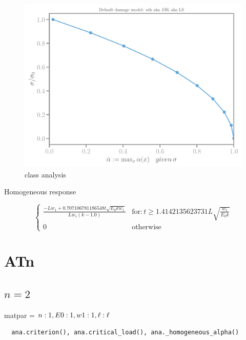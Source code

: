 \documentclass[]{article}
\begin{document}
\begin{figure}[htbp]
  \includegraphics[width=.33\textheight]{../figures/atk-maxalpha.pdf}
  \caption{class analysis}
  \label{fig:class-analyser}
\end{figure}





Homogeneous response

\begin{equation}
  \label{eqn:mod-homog}
  \begin{cases}
    \frac{- L w_{1} + 0.707106781186548 t \sqrt{E_{0} k w_{1}}}{L w_{1} \left(k - 1.0\right)} & \text{for} : t \geq 1.4142135623731 L \sqrt{\frac{w_{1}}{E_{0} k}} \\ 
    0 & \text{otherwise} 
  \end{cases}
\end{equation}






\section*{ATn}
\subsection*{$n=2$}


matpar = ${n: 1, E0: 1, w1: 1, \ell: \ell}$



\begin{Verbatim}
  ana.criterion(), ana.critical_load(), ana._homogeneous_alpha()  
\end{Verbatim}
\end{document}
